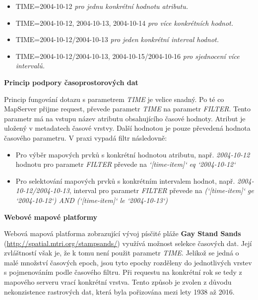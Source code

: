\begin{itemize}
\item TIME=2004-10-12 \textit{pro jednu konkrétní hodnotu atributu.}
\item TIME=2004-10-12, 2004-10-13, 2004-10-14 \textit{pro více
    konkrétních hodnot.}
\item TIME=2004-10-12/2004-10-13 \textit{pro jeden konkrétní interval
    hodnot.}
\item TIME=2004-10-12/2004-10-13, 2004-10-15/2004-10-16 \textit{pro
    sjednocení více intervalů.}
\end{itemize}

\bigskip
\noindent
\textbf{Princip podpory časoprostorových dat}

Princip fungování dotazu s parametrem \textit{TIME} je velice
snadný. Po té co MapServer přijme request, převede parametr
\textit{TIME} na parametr \textit{FILTER}. Tento parametr má na vstupu
název atributu obsahujícího časové hodnoty. Atribut je uložený v metadatech
časové vrstvy\cite{mapserver_about}. Další hodnotou je pouze převedená
hodnota časového parametru. V praxi vypadá filtr následovně:

\bigskip
\begin{itemize}
	\item Pro výběr mapových prvků s konkrétní hodnotou
atributu, např. \textit{2004-10-12} hodnotu pro parametr 
\textit{FILTER} převede  na \textit{`[time-item]` eq `2004-10-12`}
	\item Pro selektování mapových prvků s konkrétním intervalem
hodnot, např. \textit{2004-10-12/2004-10-13}, interval pro parametr
\textit{FILTER} převede na \textit{(`[time-item]` ge `2004-10-12`) AND
(`[time-item]` le `2004-10-13`)}
\end{itemize}


\bigskip
\noindent \textbf{Webové mapové platformy}

Webová mapová platforma zobrazující vývoj písčité pláže \textbf{Gay
Stand Sands} (\url{http://spatial.mtri.org/stampsands/}) využívá možnost
selekce časových dat. Její zvláštností však je, že k tomu není
použit parametr \textit{TIME}. Jelikož se jedná o malé množství
časových epoch, jsou tyto epochy rozděleny do jednotlivých vrstev s pojmenováním
podle časového filtru. Při requestu na konkrétní rok se tedy z
mapového serveru vrací konkrétní vrstva. Tento způsob je zvolen z
důvodu nekonzistence rastrových dat, která byla pořizována mezi lety
1938 až 2016.

